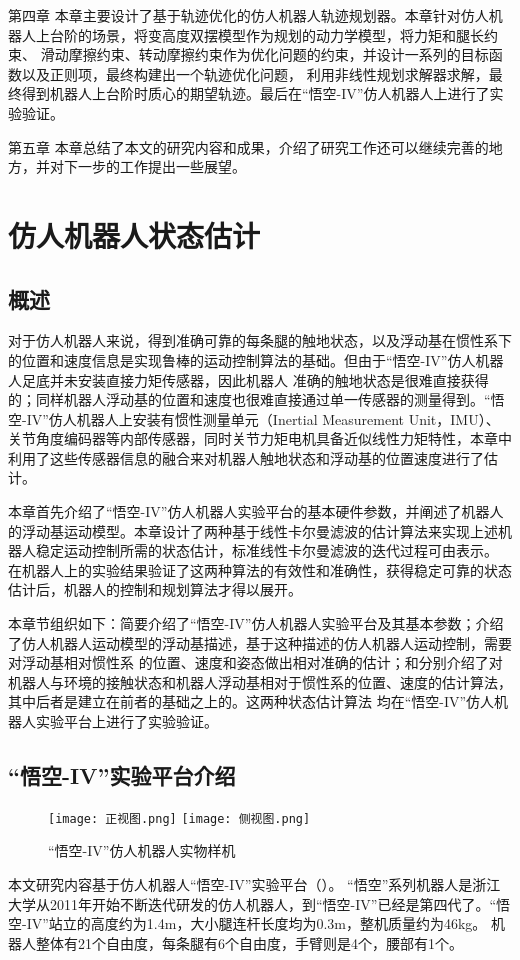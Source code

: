 第四章 本章主要设计了基于轨迹优化的仿人机器人轨迹规划器。本章针对仿人机器人上台阶的场景，将变高度双摆模型作为规划的动力学模型，将力矩和腿长约束、
滑动摩擦约束、转动摩擦约束作为优化问题的约束，并设计一系列的目标函数以及正则项，最终构建出一个轨迹优化问题，
利用非线性规划求解器求解，最终得到机器人上台阶时质心的期望轨迹。最后在“悟空-IV”仿人机器人上进行了实验验证。

第五章 本章总结了本文的研究内容和成果，介绍了研究工作还可以继续完善的地方，并对下一步的工作提出一些展望。
\chapter{仿人机器人状态估计}
\section{概述}
对于仿人机器人来说，得到准确可靠的每条腿的触地状态，以及浮动基在惯性系下的位置和速度信息是实现鲁棒的运动控制算法的基础。但由于“悟空-IV”仿人机器人足底并未安装直接力矩传感器，因此机器人
准确的触地状态是很难直接获得的；同样机器人浮动基的位置和速度也很难直接通过单一传感器的测量得到。“悟空-IV”仿人机器人上安装有惯性测量单元（Inertial Measurement Unit，IMU）、
关节角度编码器等内部传感器，同时关节力矩电机具备近似线性力矩特性，本章中利用了这些传感器信息的融合来对机器人触地状态和浮动基的位置速度进行了估计。

本章首先介绍了“悟空-IV”仿人机器人实验平台的基本硬件参数，并阐述了机器人的浮动基运动模型。本章设计了两种基于线性卡尔曼滤波的估计算法来实现上述机器人稳定运动控制所需的状态估计，标准线性卡尔曼滤波的迭代过程可由表示。
在机器人上的实验结果验证了这两种算法的有效性和准确性，获得稳定可靠的状态估计后，机器人的控制和规划算法才得以展开。

本章节组织如下：简要介绍了“悟空-IV”仿人机器人实验平台及其基本参数；介绍了仿人机器人运动模型的浮动基描述，基于这种描述的仿人机器人运动控制，需要对浮动基相对惯性系
的位置、速度和姿态做出相对准确的估计；和分别介绍了对机器人与环境的接触状态和机器人浮动基相对于惯性系的位置、速度的估计算法，其中后者是建立在前者的基础之上的。这两种状态估计算法
均在“悟空-IV”仿人机器人实验平台上进行了实验验证。
\section{“悟空-IV”实验平台介绍}
\label{sec:exp_platform}
\begin{figure}[htbp]
    \centering
        {%
            \texttt{[image: 正视图.png]}}
        {%
            \texttt{[image: 侧视图.png]}}
    \caption{“悟空-IV”仿人机器人实物样机\label{fig:wukong_pic}}
\end{figure}
本文研究内容基于仿人机器人“悟空-IV”实验平台（）。
“悟空”系列机器人是浙江大学从2011年开始不断迭代研发的仿人机器人，到“悟空-IV”已经是第四代了。“悟空-IV”站立的高度约为1.4m，大小腿连杆长度均为0.3m，整机质量约为46kg。
机器人整体有21个自由度，每条腿有6个自由度，手臂则是4个，腰部有1个。

